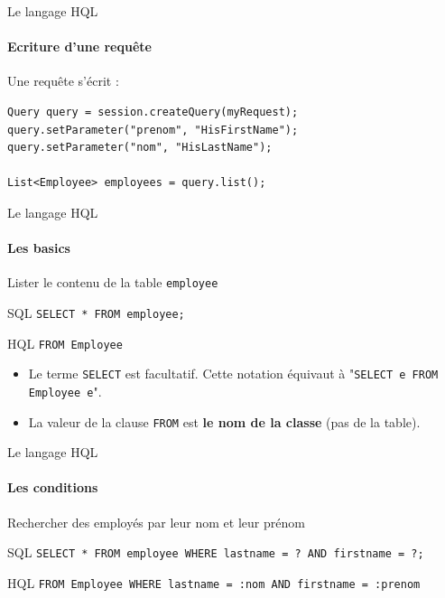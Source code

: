 \documentclass[compress]{beamer}%
\begin{document}
\begin{frame}[fragile]{Le langage HQL}
	\framesubtitle{Ecriture d'une requête}
	
	Une requête s'écrit : 
	\begin{lstlisting}
Query query = session.createQuery(myRequest);
query.setParameter("prenom", "HisFirstName");
query.setParameter("nom", "HisLastName");

List<Employee> employees = query.list();
	\end{lstlisting}

\end{frame}

\begin{frame}[fragile]{Le langage HQL}
	\framesubtitle{Les basics}
	
	\begin{block}{}
		\center
		Lister le contenu de la table \texttt{employee}
	\end{block}
	
	\begin{exampleblock}{SQL}
		\texttt{SELECT * FROM employee;}
	\end{exampleblock}

	\pause
	\begin{exampleblock}{HQL}
		\texttt{FROM Employee}
	\end{exampleblock}
	
	\pause
	\begin{itemize}
		\item Le terme \texttt{SELECT} est facultatif. Cette notation équivaut à "\texttt{SELECT e FROM Employee e}".
		\item La valeur de la clause \texttt{FROM} est \textbf{le nom de la classe} (pas de la table).
	\end{itemize}

\end{frame}

\begin{frame}[fragile]{Le langage HQL}
	\framesubtitle{Les conditions}
	
	\begin{block}{}
		\center
		Rechercher des employés par leur nom et leur prénom
	\end{block}
	
	\begin{exampleblock}{SQL}
		\texttt{SELECT * FROM employee WHERE lastname = ? AND firstname = ?;}
	\end{exampleblock}

	\pause
	\begin{exampleblock}{HQL}
		\texttt{FROM Employee WHERE lastname = :nom AND firstname = :prenom}
	\end{exampleblock}

\end{frame}
\end{document}
